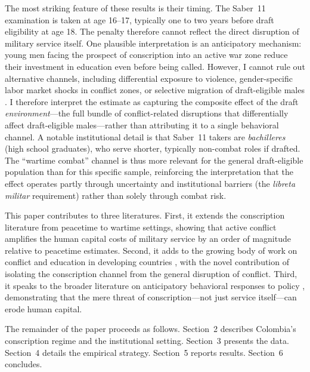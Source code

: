 \documentclass[12pt]{article}
\begin{document}
The most striking feature of these results is their timing. The Saber~11 examination is taken at age 16--17, typically one to two years before draft eligibility at age 18. The penalty therefore cannot reflect the direct disruption of military service itself. One plausible interpretation is an anticipatory mechanism: young men facing the prospect of conscription into an active war zone reduce their investment in education even before being called. However, I cannot rule out alternative channels, including differential exposure to violence, gender-specific labor market shocks in conflict zones, or selective migration of draft-eligible males \citep{sanchez2016}. I therefore interpret the estimate as capturing the composite effect of the draft \textit{environment}---the full bundle of conflict-related disruptions that differentially affect draft-eligible males---rather than attributing it to a single behavioral channel. A notable institutional detail is that Saber~11 takers are \textit{bachilleres} (high school graduates), who serve shorter, typically non-combat roles if drafted. The ``wartime combat'' channel is thus more relevant for the general draft-eligible population than for this specific sample, reinforcing the interpretation that the effect operates partly through uncertainty and institutional barriers (the \textit{libreta militar} requirement) rather than solely through combat risk.

This paper contributes to three literatures. First, it extends the conscription literature \citep{angrist1990,angrist1998,angrist2011,bingley2020,ichino2004,bedard2004} from peacetime to wartime settings, showing that active conflict amplifies the human capital costs of military service by an order of magnitude relative to peacetime estimates. Second, it adds to the growing body of work on conflict and education in developing countries \citep{leon2012,akresh2012,shemyakina2011,blattman2010,rodriguez2010,sanchez2016}, with the novel contribution of isolating the conscription channel from the general disruption of conflict. Third, it speaks to the broader literature on anticipatory behavioral responses to policy \citep{manski2000}, demonstrating that the mere threat of conscription---not just service itself---can erode human capital.

The remainder of the paper proceeds as follows. Section~2 describes Colombia's conscription regime and the institutional setting. Section~3 presents the data. Section~4 details the empirical strategy. Section~5 reports results. Section~6 concludes.
\end{document}
